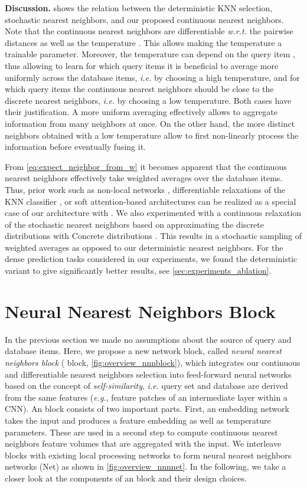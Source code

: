 \documentclass{article}
\makeatletter
\newcommand{\eg}{\emph{e.\thinspace{}g.}\@\xspace}
\newcommand{\ie}{\emph{i.\thinspace{}e.}\@\xspace}
\newcommand{\wrt}{\emph{w.\thinspace{}r.\thinspace{}t.}\@\xspace}
\newcommand{\myparagraph}[1]{\smallskip\noindent\textbf{#1}}
\makeatother
\begin{document}
\myparagraph{Discussion.}
 shows the relation between the deterministic KNN selection, stochastic nearest neighbors, and our proposed continuous nearest neighbors.
Note that the continuous nearest neighbors are differentiable \wrt 
the pairwise distances as well as the temperature . 
This allows making the temperature a trainable parameter. Moreover, the
temperature can depend on the query item , thus allowing to learn for
which query items it is beneficial to average more uniformly across the
database items, \ie by choosing a high temperature, and for which query items
the continuous nearest neighbors should be close to the discrete nearest
neighbors, \ie by choosing a low temperature. 
Both cases have their justification. 
A more uniform averaging effectively allows to aggregate information from many neighbors at once.
On the other hand, the more distinct neighbors obtained with a low temperature allow to first non-linearly process the information before eventually fusing it.


From \cref{eq:expect_neighbor_from_w} it becomes apparent that the
continuous nearest neighbors effectively take  weighted averages over
the database items.
Thus, prior work such as non-local networks \cite{Wang:2017:NLN}, differentiable relaxations of the KNN classifier \cite{Vinyals:2016:MNF}, or soft attention-based architectures \cite{Graves:2014:NTM} can be realized as a special case of our architecture with .
We also experimented with a continuous relaxation of the 
stochastic nearest neighbors
based on approximating the discrete distributions with Concrete distributions
\cite{Jang:2016:CRW,Maddison:2016:TCD}.
This results in a stochastic sampling of weighted averages as opposed to our deterministic nearest neighbors.
For the dense prediction tasks considered in our experiments, we found
the deterministic variant to give significantly better results, see \cref{sec:experiments_ablation}.  \section{Neural Nearest Neighbors Block}
\label{sec:nldn}
In the previous section we made no assumptions about the source of query and database items. 
Here, we propose a new network block, called \emph{neural nearest neighbors block} ( block, \cref{fig:overview_nnnblock}), 
which integrates our continuous and differentiable nearest neighbors selection
into feed-forward neural networks based on the concept of \emph{self-similarity},
\ie query set and database are derived from the same features
(\eg, feature patches of an intermediate layer within a CNN).
An  block consists of two important parts.
First, an embedding network takes the input and produces a feature embedding as well as temperature parameters.
These are used in a second step to compute continuous nearest neighbors feature volumes that are aggregated with the input.
We interleave  blocks with existing local processing networks to form neural nearest neighbors networks (Net) as shown in \cref{fig:overview_nnnnet}.
In the following, we take a closer look at the components of an  block and their design choices.
\end{document}
